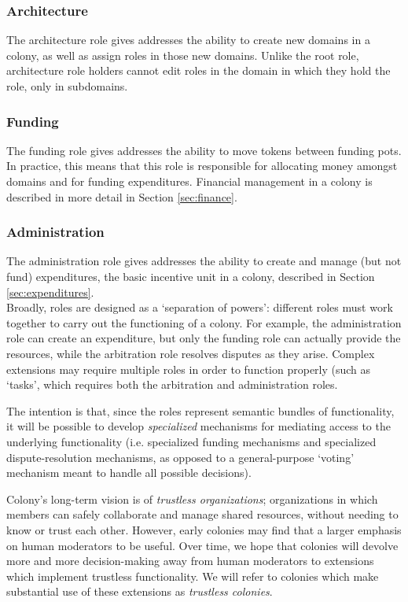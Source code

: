 \subsubsection*{Architecture}

The architecture role gives addresses the ability to create new domains in a colony, as well as assign roles in those new domains. Unlike the root role, architecture role holders cannot edit roles in the domain in which they hold the role, only in subdomains.

\subsubsection*{Funding}

The funding role gives addresses the ability to move tokens between funding pots. In practice, this means that this role is responsible for allocating money amongst domains and for funding expenditures. Financial management in a colony is described in more detail in Section \ref{sec:finance}.

\subsubsection*{Administration}

The administration role gives addresses the ability to create and manage (but not fund) expenditures, the basic incentive unit in a colony, described in Section \ref{sec:expenditures}. \\

Broadly, roles are designed as a `separation of powers': different roles must work together to carry out the functioning of a colony. For example, the administration role can create an expenditure, but only the funding role can actually provide the resources, while the arbitration role resolves disputes as they arise. Complex extensions may require multiple roles in order to function properly (such as `tasks', which requires both the arbitration and administration roles.

The intention is that, since the roles represent semantic bundles of functionality, it will be possible to develop \textit{specialized} mechanisms for mediating access to the underlying functionality (i.e. specialized funding mechanisms and specialized dispute-resolution mechanisms, as opposed to a general-purpose `voting' mechanism meant to handle all possible decisions).

Colony's long-term vision is of \textit{trustless organizations}; organizations in which members can safely collaborate and manage shared resources, without needing to know or trust each other. However, early colonies may find that a larger emphasis on human moderators to be useful. Over time, we hope that colonies will devolve more and more decision-making away from human moderators to extensions which implement trustless functionality. We will refer to colonies which make substantial use of these extensions as \textit{trustless colonies}.

